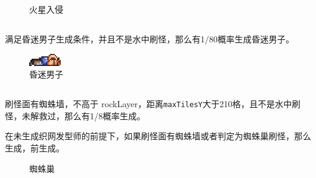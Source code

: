 \begin{figure}[!ht]
    \caption{火星入侵}
\end{figure}

\subsection{}
满足昏迷男子生成条件，并且不是水中刷怪，那么有1/80概率生成昏迷男子。
\begin{figure}[!ht]
    \centering
    \includegraphics{npcs/Unconscious_Man.png}
    \caption{昏迷男子}
\end{figure}

\subsection{}
刷怪面有蜘蛛墙，不高于 rockLayer，距离\lstinline{maxTilesY}大于210格，且不是水中刷怪，未解救过，那么有1/8概率生成。

在未生成织网发型师的前提下，如果刷怪面有蜘蛛墙或者判定为蜘蛛巢刷怪，那么生成，前生成。
\begin{figure}[!ht]
    \centering
    \caption{蜘蛛巢}
\end{figure}

